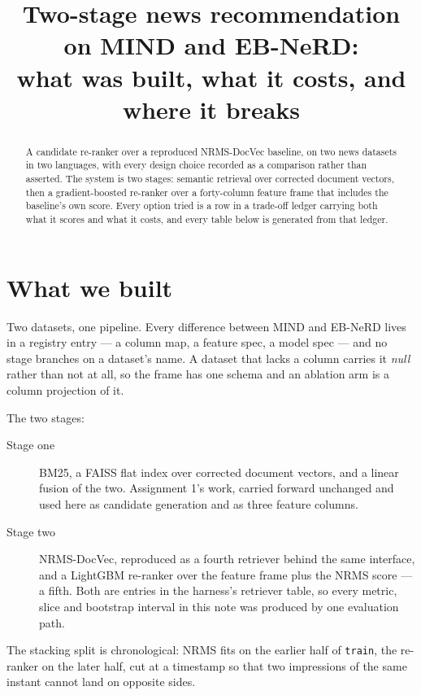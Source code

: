 \documentclass[11pt,a4paper]{article}
\title{Two-stage news recommendation on MIND and EB-NeRD:\\
       what was built, what it costs, and where it breaks}
\author{}
\date{}
\begin{document}
\maketitle

\begin{abstract}
A candidate re-ranker over a reproduced NRMS-DocVec baseline, on two news
datasets in two languages, with every design choice recorded as a comparison
rather than asserted. The system is two stages: semantic retrieval over
corrected document vectors, then a gradient-boosted re-ranker over a
forty-column feature frame that includes the baseline's own score. Every
option tried is a row in a trade-off ledger carrying both what it scores and
what it costs, and every table below is generated from that ledger.
\end{abstract}

\tableofcontents

\section{What we built}

Two datasets, one pipeline. Every difference between MIND and EB-NeRD lives in
a registry entry --- a column map, a feature spec, a model spec --- and no
stage branches on a dataset's name. A dataset that lacks a column carries it
\emph{null} rather than not at all, so the frame has one schema and an ablation
arm is a column projection of it.

The two stages:

\begin{description}
  \item[Stage one] BM25, a FAISS flat index over corrected document vectors,
    and a linear fusion of the two. Assignment 1's work, carried forward
    unchanged and used here as candidate generation and as three feature
    columns.
  \item[Stage two] NRMS-DocVec, reproduced as a fourth retriever behind the
    same interface, and a LightGBM re-ranker over the feature frame plus the
    NRMS score --- a fifth. Both are entries in the harness's retriever table,
    so every metric, slice and bootstrap interval in this note was produced by
    one evaluation path.
\end{description}

The stacking split is chronological: NRMS fits on the earlier half of
\texttt{train}, the re-ranker on the later half, cut at a timestamp so that two
impressions of the same instant cannot land on opposite sides.
\end{document}
